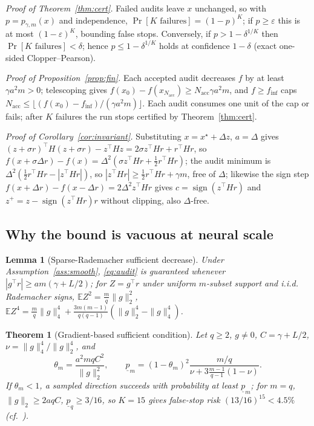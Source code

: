 \documentclass{article}
\newtheorem{lemma}{Lemma}
\newtheorem{theorem}{Theorem}
\newcommand{\E}{\mathbb{E}}
\newcommand{\D}{\Delta}
\begin{document}
\emph{Proof of Theorem~\ref{thm:cert}.} Failed audits leave $x$ unchanged, so with $p=p_{\gamma,m}(x)$ and independence, $\Pr[\text{$K$ failures}]=(1-p)^K$; if $p\ge\varepsilon$ this is at most $(1-\varepsilon)^K$, bounding false stops. Conversely, if $p>1-\delta^{1/K}$ then $\Pr[\text{$K$ failures}]<\delta$; hence $p\le1-\delta^{1/K}$ holds at confidence $1-\delta$ (exact one-sided Clopper--Pearson).

\emph{Proof of Proposition~\ref{prop:fin}.} Each accepted audit decreases $f$ by at least $\gamma a^2m>0$; telescoping gives $f(x_0)-f(x_{N_{\mathrm{acc}}})\ge N_{\mathrm{acc}}\gamma a^2m$, and $f\ge f_{\inf}$ caps $N_{\mathrm{acc}}\le\lfloor(f(x_0)-f_{\inf})/(\gamma a^2m)\rfloor$. Each audit consumes one unit of the cap or fails; after $K$ failures the run stops certified by Theorem~\ref{thm:cert}.

\emph{Proof of Corollary~\ref{cor:invariant}.} Substituting $x=x^\star+\D z$, $a=\D$ gives $(z+\sigma r)^\top H(z+\sigma r)-z^\top Hz=2\sigma z^\top Hr+r^\top Hr$, so $f(x+\sigma\D r)-f(x)=\D^2(\sigma z^\top Hr+\frac12r^\top Hr)$; the audit minimum is $\D^2(\frac12r^\top Hr-|z^\top Hr|)$, so $|z^\top Hr|\ge\frac12r^\top Hr+\gamma m$, free of $\D$; likewise the sign step $f(x+\D r)-f(x-\D r)=2\D^2z^\top Hr$ gives $c=\operatorname{sign}(z^\top Hr)$ and $z^+=z-\operatorname{sign}(z^\top Hr)r$ without clipping, also $\D$-free.

\subsection{Why the bound is vacuous at neural scale}
\begin{lemma}[Sparse-Rademacher sufficient decrease]
\label{lem:decrease}
Under Assumption~\ref{ass:smooth}, \eqref{eq:audit} is guaranteed whenever $|g^\top r|\ge am(\gamma+L/2)$; for $Z=g^\top r$ under uniform $m$-subset support and i.i.d. Rademacher signs, $\E Z^2=\frac mq\|g\|_2^2$, $\E Z^4=\frac mq\|g\|_4^4+\frac{3m(m-1)}{q(q-1)}(\|g\|_2^4-\|g\|_4^4)$.
\end{lemma}

\begin{theorem}[Gradient-based sufficient condition]
\label{thm:grad}
Let $q\ge2$, $g\neq0$, $C=\gamma+L/2$, $\nu=\|g\|_4^4/\|g\|_2^4$, and
\begin{equation}
\theta_m=\frac{a^2mqC^2}{\|g\|_2^2},\qquad
\underline p_m=(1-\theta_m)^2\frac{m/q}{\nu+3\frac{m-1}{q-1}(1-\nu)}.
\label{eq:paudit}
\end{equation}
If $\theta_m<1$, a sampled direction succeeds with probability at least $\underline p_m$; for $m=q$, $\|g\|_2\ge2aqC$, $\underline p_q\ge3/16$, so $K=15$ gives false-stop risk $(13/16)^{15}<4.5\%$ (cf.\ \cite{ghadimi2013stochastic,nesterov2017random}).
\end{theorem}
\end{document}
